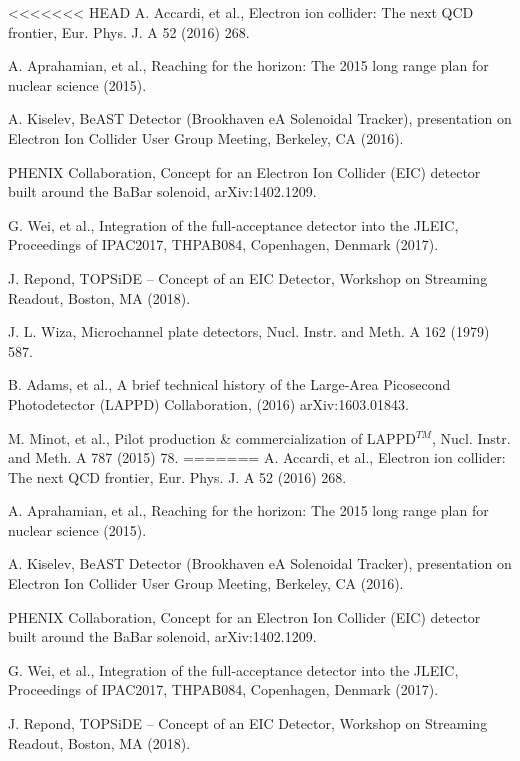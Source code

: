 ﻿\documentclass[preprint,5p]{elsarticle}
\begin{document}
\begin{thebibliography}{00}

<<<<<<< HEAD
A. Accardi, et al., Electron ion collider: The next QCD frontier, Eur. Phys.  
      J. A 52 (2016) 268.

A. Aprahamian, et al., Reaching for the horizon: The 2015 long range plan for 
      nuclear science (2015).

A. Kiselev, BeAST Detector (Brookhaven eA Solenoidal Tracker), presentation on 
      Electron Ion Collider User Group Meeting, Berkeley, CA (2016).

PHENIX Collaboration, Concept for an Electron Ion Collider (EIC) detector built 
      around the BaBar solenoid, arXiv:1402.1209.

G. Wei, et al., Integration of the full-acceptance detector into the JLEIC, 
      Proceedings of IPAC2017, THPAB084, Copenhagen, Denmark (2017).

J. Repond, TOPSiDE – Concept of an EIC Detector, Workshop on Streaming Readout, 
      Boston, MA (2018).

J. L. Wiza, Microchannel plate detectors, Nucl. Instr. and Meth. A 162 (1979) 
      587.

B. Adams, et al., A brief technical history of the Large-Area Picosecond 
      Photodetector (LAPPD) Collaboration, (2016) arXiv:1603.01843.

M. Minot, et al., Pilot production \& commercialization of LAPPD$^{𝑇𝑀}$, Nucl.  
      Instr. and Meth. A 787 (2015) 78.
=======
A. Accardi, et al., Electron ion collider: The next QCD frontier, Eur. Phys. J. A 52 (2016) 268.

A. Aprahamian, et al., Reaching for the horizon: The 2015 long range plan for nuclear science (2015).

A. Kiselev, BeAST Detector (Brookhaven eA Solenoidal Tracker), presentation on Electron Ion Collider User Group Meeting, Berkeley, CA (2016).

PHENIX Collaboration, Concept for an Electron Ion Collider (EIC) detector built around the BaBar solenoid, arXiv:1402.1209.

G. Wei, et al., Integration of the full-acceptance detector into the JLEIC, Proceedings of IPAC2017, THPAB084, Copenhagen, Denmark (2017).

J. Repond, TOPSiDE – Concept of an EIC Detector, Workshop on Streaming Readout, Boston, MA (2018).


\end{thebibliography}
\end{document}
